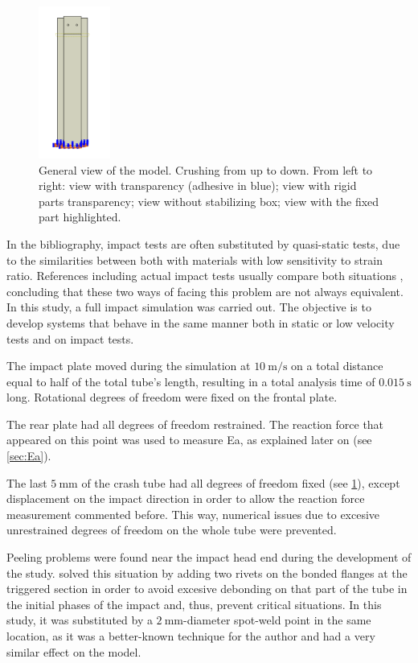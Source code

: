 \documentclass[cmfonts]{witpress}
\begin{document}
\begin{figure}
\begin{minipage}[b]{.22\linewidth}
		\centering
		\includegraphics[height=5cm]{figures/IMG_CUTRES/general_encastre}
	\end{minipage}
	\caption[General view of the model.]{General view of the model. Crushing from up to down. From left to right: view with transparency (adhesive in blue); view with rigid parts transparency; view without stabilizing box; view with the fixed part highlighted.}
	\label{fig:general}
\end{figure}

In the bibliography, impact tests are often substituted by quasi-static tests, due to the similarities between both with materials with low sensitivity to strain ratio. References including actual impact tests usually compare both situations \cite{Goglio2008, Peroni2009}, concluding that these two ways of facing this problem are not always equivalent. In this study, a full impact simulation was carried out. The objective is to develop systems that behave in the same manner both in static or low velocity tests and on impact tests.

The impact plate moved during the simulation at $\SI{10}{\m/\s}$ on a total distance equal to half of the total tube's length, resulting in a total analysis time of $\SI{0.015}{\s}$ long. Rotational degrees of freedom were fixed on the frontal plate.

The rear plate had all degrees of freedom restrained. The reaction force that appeared on this point was used to measure Ea, as explained later on (see \cref{sec:Ea}).

The last $\SI{5}{\mm}$ of the crash tube had all degrees of freedom fixed (see \cref{fig:general}), except displacement on the impact direction in order to allow the reaction force measurement commented before. This way, numerical issues due to excesive unrestrained degrees of freedom on the whole tube were prevented.


Peeling problems were found near the impact head end during the development of the study. \cite{Peroni2009} solved this situation by adding two rivets on the bonded flanges at the triggered section in order to avoid excesive debonding on that part of the tube in the initial phases of the impact and, thus, prevent critical situations. In this study, it was substituted by a $\SI{2}{\mm}$-diameter spot-weld point in the same location, as it was a better-known technique for the author and had a very similar effect on the model.
\end{document}
